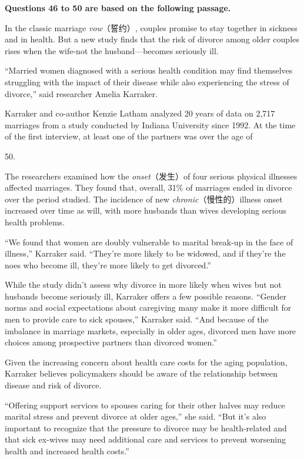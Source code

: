 \documentclass[UTF8,11pt]{ctexart}
\begin{document}
\textbf{Questions 46 to 50 are based on the following passage.}


In the classic marriage\textit{ vow}（誓约）, couples promise to stay together in sickness and in health. But a new study finds that the risk of divorce among older couples rises when the wife-not the husband—becomes seriously ill.


“Married women diagnosed with a serious health condition may find themselves struggling with the impact of their disease while also experiencing the stress of divorce,” said researcher Amelia Karraker.


Karraker and co-author Kenzie Latham analyzed 20 years of data on 2,717 marriages from a study conducted by Indiana University since 1992. At the time of the first interview, at least one of the partners was over the age of


50.


The researchers examined how the\textit{ onset}（发生）of four serious physical illnesses affected marriages. They found that, overall, 31\% of marriages ended in divorce over the period studied. The incidence of new\textit{ chronic}（慢性的）illness onset increased over time as will, with more husbands than wives developing serious health problems.


“We found that women are doubly vulnerable to marital break-up in the face of illness,” Karraker said. “They’re more likely to be widowed, and if they’re the noes who become ill, they’re more likely to get divorced.”


While the study didn’t assess why divorce in more likely when wives but not husbands become seriously ill, Karraker offers a few possible reasons. “Gender norms and social expectations about caregiving many make it more difficult for men to provide care to sick spouses,” Karraker said. “And because of the imbalance in marriage markets, especially in older ages, divorced men have more choices among prospective partners than divorced women.”


Given the increasing concern about health care costs for the aging population, Karraker believes policymakers should be aware of the relationship between disease and risk of divorce.


“Offering support services to spouses caring for their other halves may reduce marital stress and prevent divorce at older ages,” she said. “But it’s also important to recognize that the pressure to divorce may be health-related and that sick ex-wives may need additional care and services to prevent worsening health and increased health costs.”
\end{document}
